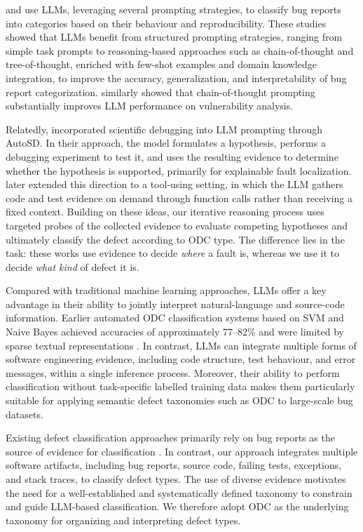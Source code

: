 \documentclass{iutbscthesis}
\begin{document}
\textcite{li2024knowbug} and \textcite{du2024llm} use LLMs, leveraging several prompting strategies, to classify bug reports into categories based on their behaviour and reproducibility. These studies showed that LLMs benefit from structured prompting strategies, ranging from simple task prompts to reasoning-based approaches such as chain-of-thought and tree-of-thought, enriched with few-shot examples and domain knowledge integration, to improve the accuracy, generalization, and interpretability of bug report categorization. \textcite{nong2024cot} similarly showed that chain-of-thought prompting substantially improves LLM performance on vulnerability analysis.

Relatedly, \textcite{kang2023autosd} incorporated scientific debugging into LLM prompting through AutoSD. In their approach, the model formulates a hypothesis, performs a debugging experiment to test it, and uses the resulting evidence to determine whether the hypothesis is supported, primarily for explainable fault localization. \textcite{kang2024autofl} later extended this direction to a tool-using setting, in which the LLM gathers code and test evidence on demand through function calls rather than receiving a fixed context. Building on these ideas, our iterative reasoning process uses targeted probes of the collected evidence to evaluate competing hypotheses and ultimately classify the defect according to ODC type. The difference lies in the task: these works use evidence to decide \emph{where} a fault is, whereas we use it to decide \emph{what kind} of defect it is.

Compared with traditional machine learning approaches, LLMs offer a key advantage in their ability to jointly interpret natural-language and source-code information. Earlier automated ODC classification systems based on SVM and Naive Bayes achieved accuracies of approximately 77--82\% and were limited by sparse textual representations \cite{huang2011autoodc, thung2012automatic}. In contrast, LLMs can integrate multiple forms of software engineering evidence, including code structure, test behaviour, and error messages, within a single inference process. Moreover, their ability to perform classification without task-specific labelled training data makes them particularly suitable for applying semantic defect taxonomies such as ODC to large-scale bug datasets.

Existing defect classification approaches primarily rely on bug reports as the source of evidence for classification \cite{colavito2024llm, koyuncu2025exploring, li2024knowbug, du2024llm}. In contrast, our approach integrates multiple software artifacts, including bug reports, source code, failing tests, exceptions, and stack traces, to classify defect types. The use of diverse evidence motivates the need for a well-established and systematically defined taxonomy to constrain and guide LLM-based classification. We therefore adopt ODC as the underlying taxonomy for organizing and interpreting defect types.
\end{document}
